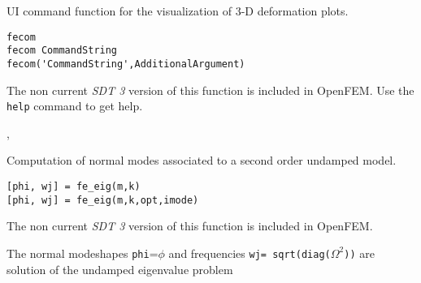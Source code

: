 

\noindent UI command function for the visualization of 3-D deformation plots.

\rsyntax\begin{verbatim}
fecom
fecom CommandString
fecom('CommandString',AdditionalArgument)
\end{verbatim}\nlvs


The non current {\sl SDT 3} version of this function is included in OpenFEM. Use the {\tt help}  command to get help.



\noindent \feplot, \femesh








\noindent Computation of normal modes associated to a second order undamped model.%
%
%
 

\rsyntax\begin{verbatim}
[phi, wj] = fe_eig(m,k)
[phi, wj] = fe_eig(m,k,opt,imode)
\end{verbatim}\nlvs


The non current {\sl SDT 3} version of this function is included in OpenFEM. 


\noindent The normal modeshapes {\tt phi}=$\phi$ and frequencies {\tt wj= sqrt(diag(}$\Omega^2${\tt))} are solution of the undamped eigenvalue problem 

